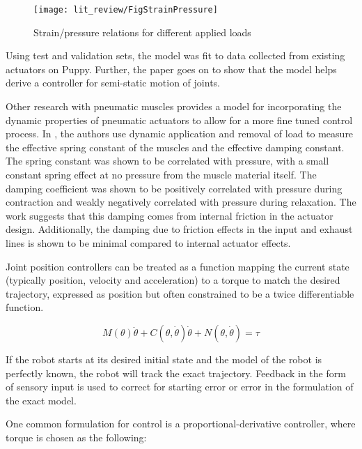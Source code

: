 \begin{figure}[h!]
\centering
\texttt{[image: lit\_review/FigStrainPressure]}
\caption{Strain/pressure relations for different applied loads}
\label{fig:StrainPressure}
\end{figure}

Using test and validation sets, the model was fit to data collected
from existing actuators on Puppy. Further, the paper goes on to show that the
model helps derive a controller for semi-static motion of joints. 
\cite{HuntPMuscles}

Other research with pneumatic muscles provides a model for incorporating the
dynamic properties of pneumatic actuators to allow for a more fine tuned control
process. In \cite{DynamicPMuscles}, the authors use dynamic application and
removal of load to measure the effective spring constant of the muscles and the
effective damping constant. The spring constant was shown to be correlated with
pressure, with a small constant spring effect at no pressure from the muscle
material itself. The damping coefficient was shown to be positively correlated
with pressure during contraction and weakly negatively correlated with pressure
during relaxation. The work suggests that this damping comes from internal
friction in the actuator design. Additionally, the damping due to friction
effects in the input and exhaust lines is shown to be minimal compared to
internal actuator effects. \cite{DynamicPMuscles}

\cite{einstein}


Joint position controllers can be treated as a function mapping the current
state (typically position, velocity and acceleration) to a torque to match the 
desired trajectory, expressed as position but often constrained to be a twice
differentiable function.

\begin{equation}
M(\theta) \ddot{\theta} + C(\theta, \dot{\theta}) \dot{\theta} + N(\theta, \dot{\theta}) = \tau
\end{equation}

If the robot starts at its desired initial state and the model of the robot is
perfectly known, the robot will track the exact trajectory. Feedback in the 
form of sensory input is used to correct for starting error or error in the 
formulation of the exact model.

One common formulation for control is a proportional-derivative controller, 
where torque is chosen as the following:

